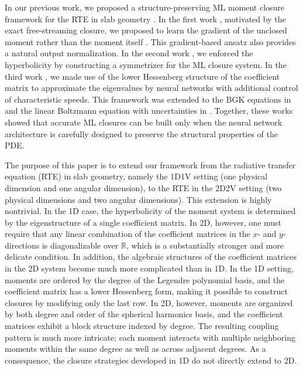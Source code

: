 \documentclass[11pt]{article}
\numberwithin{equation}{section}
\begin{document}
In our previous work, we proposed a structure-preserving ML moment closure framework for the RTE in slab geometry \cite{huang2022mlmc1,huang2021mlmc2,huang2022mlmc3}. In the first work \cite{huang2022mlmc1}, motivated by the exact free-streaming closure, we proposed to learn the gradient of the unclosed moment rather than the moment itself \cite{huang2022mlmc1}. This gradient-based ansatz also provides a natural output normalization. In the second work \cite{huang2021mlmc2}, we enforced the hyperbolicity by constructing a symmetrizer for the ML closure system. In the third work \cite{huang2022mlmc3}, we made use of the lower Hessenberg structure of the coefficient matrix to approximate the eigenvalues by neural networks with additional control of characteristic speeds. This framework was extended to the BGK equations in \cite{christlieb2025hyperbolic} and the linear Boltzmann equation with uncertainties in \cite{huang2026machine}.
Together, these works showed that accurate ML closures can be built only when the neural network architecture is carefully designed to preserve the structural properties of the PDE.

The purpose of this paper is to extend our framework from the radiative transfer equation (RTE) in slab geometry, namely the 1D1V setting (one physical dimension and one angular dimension), to the RTE in the 2D2V setting (two physical dimensions and two angular dimensions). This extension is highly nontrivial. In the 1D case, the hyperbolicity of the moment system is determined by the eigenstructure of a single coefficient matrix. In 2D, however, one must require that any linear combination of the coefficient matrices in the $x$- and $y$-directions is diagonalizable over $\mathbb{R}$, which is a substantially stronger and more delicate condition.
In addition, the algebraic structures of the coefficient matrices in the 2D system become much more complicated than in 1D. In the 1D setting, moments are ordered by the degree of the Legendre polynomial basis, and the coefficient matrix has a lower Hessenberg form, making it possible to construct closures by modifying only the last row. In 2D, however, moments are organized by both degree and order of the spherical harmonics basis, and the coefficient matrices exhibit a block structure indexed by degree. The resulting coupling pattern is much more intricate: each moment interacts with multiple neighboring moments within the same degree as well as across adjacent degrees. As a consequence, the closure strategies developed in 1D do not directly extend to 2D.
\end{document}
